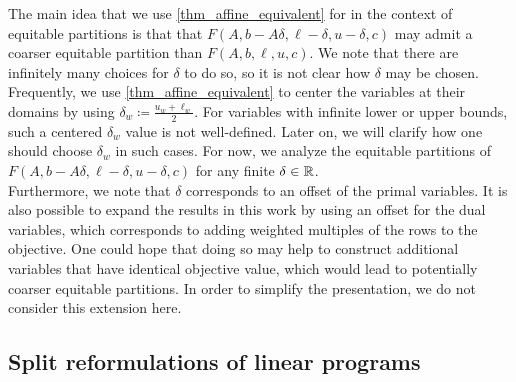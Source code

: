 \documentclass[pdflatex,sn-mathphys-num]{sn-jnl}%
\theoremstyle{thmstyleone}%
\theoremstyle{thmstylethree}%
\theoremstyle{thmstyletwo}%
\begin{document}
The main idea that we use \cref{thm_affine_equivalent} for in the context of equitable partitions is that that $F(A,b-A \delta, \ell-\delta,u-\delta,c)$ may admit a coarser equitable partition than $F(A,b,\ell,u,c)$. 
We note that there are infinitely many choices for $\delta$ to do so, so it is not clear how $\delta$ may be chosen. Frequently, we use \cref{thm_affine_equivalent} to center the variables at their domains by using $\delta_w \coloneqq \frac{u_w + \ell_w}{2}$. 
For variables with infinite lower or upper bounds, such a centered $\delta_w$ value is not well-defined. Later on, we will clarify how one should choose $\delta_w$ in such cases. For now, we analyze the equitable partitions of $F(A,b-A \delta, \ell-\delta,u-\delta,c)$ for any finite $\delta \in \mathbb{R}$.\\

Furthermore, we note that $\delta$ corresponds to an offset of the primal variables. It is also possible to expand the results in this work by using an offset for the dual variables, which corresponds to adding weighted multiples of the rows to the objective. One could hope that doing so may help to construct additional variables that have identical objective value, which would lead to potentially coarser equitable partitions. In order to simplify the presentation, we do not consider this extension here.


\subsection{Split reformulations of linear programs}
\end{document}
